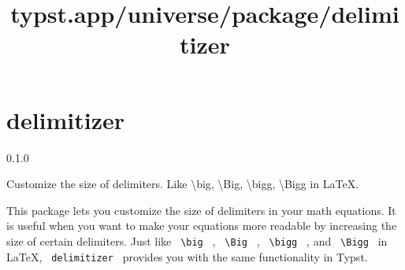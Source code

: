 \title{typst.app/universe/package/delimitizer}

\label{banner}
\section{delimitizer}\label{delimitizer}

{ 0.1.0 }

Customize the size of delimiters. Like \textbackslash big,
\textbackslash Big, \textbackslash bigg, \textbackslash Bigg in LaTeX.

\label{readme}
This package lets you customize the size of delimiters in your math
equations. It is useful when you want to make your equations more
readable by increasing the size of certain delimiters. Just like
\texttt{\ \textbackslash{}big\ } , \texttt{\ \textbackslash{}Big\ } ,
\texttt{\ \textbackslash{}bigg\ } , and
\texttt{\ \textbackslash{}Bigg\ } in LaTeX, \texttt{\ delimitizer\ }
provides you with the same functionality in Typst.

